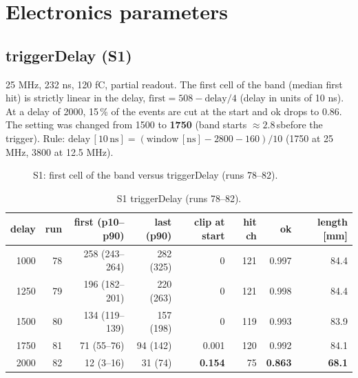 \documentclass[a4paper,11pt]{article}
\newcommand{\us}{\,\textmu s}
\begin{document}
\section{Electronics parameters}

\subsection{triggerDelay (S1)}
25 MHz, 232 ns, 120 fC, partial readout. The first cell of the band (median first hit) is strictly linear in the delay,
$\mathrm{first} = 508 - \mathrm{delay}/4$ (delay in units of 10 ns). At a delay of 2000, 15\,\% of the events are cut at the start and ok drops to 0.86.
The setting was changed from 1500 to \textbf{1750} (band starts $\approx 2.8$\us before the trigger). Rule: $\mathrm{delay}\,[10\,\mathrm{ns}] = (\text{window}\,[\mathrm{ns}] - 2800 - 160)/10$ (1750 at 25 MHz, 3800 at 12.5 MHz).

\begin{figure}[h]\centering
{}
\caption{S1: first cell of the band versus triggerDelay (runs 78--82).}
\end{figure}

\begin{table}[h]\centering\small
\caption{S1 triggerDelay (runs 78--82).}
\begin{tabular}{rrrrrrrr}
\toprule
delay & run & first (p10--p90) & last (p90) & clip at start & hit ch & ok & length [mm] \\
\midrule
1000 & 78 & 258 (243--264) & 282 (325) & 0 & 121 & 0.997 & 84.4 \\
1250 & 79 & 196 (182--201) & 220 (263) & 0 & 121 & 0.998 & 84.4 \\
1500 & 80 & 134 (119--139) & 157 (198) & 0 & 119 & 0.993 & 83.9 \\
1750 & 81 & 71 (55--76) & 94 (142) & 0.001 & 120 & 0.992 & 84.1 \\
2000 & 82 & 12 (3--16) & 31 (74) & \textbf{0.154} & 75 & \textbf{0.863} & \textbf{68.1} \\
\bottomrule
\end{tabular}
\end{table}
\end{document}
